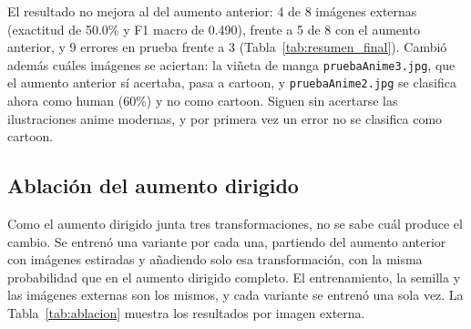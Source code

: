 \documentclass[letterpaper, 10 pt]{IEEEconf}
\begin{document}
El resultado no mejora al del aumento anterior: 4 de 8 imágenes externas (exactitud de 50.0\% y F1 macro de 0.490), frente a 5 de 8 con el aumento anterior, y 9 errores en prueba frente a 3 (Tabla~\ref{tab:resumen_final}). Cambió además cuáles imágenes se aciertan: la viñeta de manga \texttt{pruebaAnime3.jpg}, que el aumento anterior sí acertaba, pasa a cartoon, y \texttt{pruebaAnime2.jpg} se clasifica ahora como human (60\%) y no como cartoon. Siguen sin acertarse las ilustraciones anime modernas, y por primera vez un error no se clasifica como cartoon.

\subsection{Ablación del aumento dirigido}

Como el aumento dirigido junta tres transformaciones, no se sabe cuál produce el cambio. Se entrenó una variante por cada una, partiendo del aumento anterior con imágenes estiradas y añadiendo solo esa transformación, con la misma probabilidad que en el aumento dirigido completo. El entrenamiento, la semilla y las imágenes externas son los mismos, y cada variante se entrenó una sola vez. La Tabla~\ref{tab:ablacion} muestra los resultados por imagen externa.

\begin{table}[H]
\caption{Predicciones por imagen externa de la ablación (entre paréntesis, la confianza). Base: aumento anterior con imágenes estiradas; Dir.: las tres transformaciones juntas}
\label{tab:ablacion}
\centering
\footnotesize
{}
\end{table}
\end{document}
